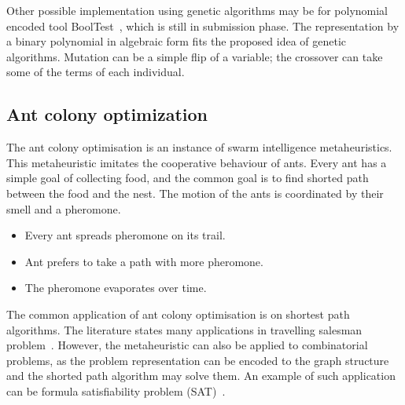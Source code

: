 \documentclass[
  print, %
  Table,   %
  nolof,     %
  nolot,     %
  11pt, %
  oneside  %
]{fithesis3}
\begin{document}
Other possible implementation using genetic algorithms may be for polynomial encoded tool BoolTest~\cite{sys2017detecting}, which is still in submission phase. The representation by a binary polynomial in algebraic form fits the proposed idea of genetic algorithms. Mutation can be a simple flip of a variable; the crossover can take some of the terms of each individual.



\subsection{Ant colony optimization}
\label{subsec:opt-multi-sol-aco}

The ant colony optimisation is an instance of swarm intelligence metaheuristics. This metaheuristic imitates the cooperative behaviour of ants. Every ant has a simple goal of collecting food, and the common goal is to find shorted path between the food and the nest. The motion of the ants is coordinated by their smell and a pheromone.

\begin{itemize}
    \item Every ant spreads pheromone on its trail.
    \item Ant prefers to take a path with more pheromone.
    \item The pheromone evaporates over time.
\end{itemize}

The common application of ant colony optimisation is on shortest path algorithms. The literature states many applications in travelling salesman problem~\cite{dorigo1997ant, dorigo1997ant}. However, the metaheuristic can also be applied to combinatorial problems, as the problem representation can be encoded to the graph structure and the shorted path algorithm may solve them. An example of such application can be formula satisfiability problem (SAT)~\cite{moritz2010solving}.
\end{document}
